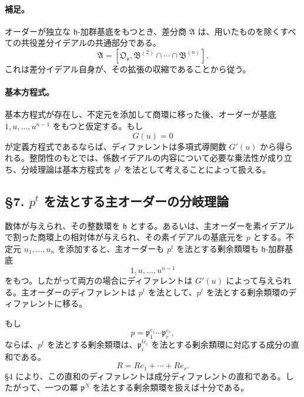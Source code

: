 \paragraph{補足。}
オーダーが独立な \(\mathfrak h\)-加群基底をもつとき、差分商 \(\mathfrak A\) は、用いたものを除くすべての共役差分イデアルの共通部分である。
\[
        \mathfrak A=[\mathfrak O_{\mathfrak o},
        \mathfrak B^{(2)}\cap\cdots\cap\mathfrak B^{(n)}].
\]
これは差分イデアル自身が、その拡張の収縮であることから従う。

\paragraph{基本方程式。}
基本方程式が存在し、不定元を添加して商環に移った後、オーダーが基底 \(1,u,\ldots,u^{n-1}\) をもつと仮定する。もし
\[
        G(u)=0
\]
が定義方程式であるならば、ディファレントは多項式導関数 \(G'(u)\) から得られる。整閉性のもとでは、係数イデアルの内容について必要な乗法性が成り立ち、分岐理論は基本方程式を \(p^t\) を法として考えることによって扱える。

\subsection*{§7. \(p^t\) を法とする主オーダーの分岐理論}

数体が与えられ、その整数環を \(\mathfrak h\) とする。あるいは、主オーダーを素イデアルで割った商環上の相対体が与えられ、その素イデアルの基底元を \(p\) とする。不定元 \(u_1,\ldots,u_n\) を添加すると、主オーダーも \(p^t\) を法とする剰余類環も \(\mathfrak h\)-加群基底
\[
        1,u,\ldots,u^{n-1}
\]
をもつ。したがって両方の場合にディファレントは \(G'(u)\) によって与えられる。主オーダーのディファレントは \(p^t\) を法として、\(p^t\) を法とする剰余類環のディファレントに移る。

もし
\[
        p=\mathfrak p_1^{e_1}\cdots\mathfrak p_r^{e_r},
\]
ならば、\(p^t\) を法とする剰余類環は、\(\mathfrak p_i^{te_i}\) を法とする剰余類環に対応する成分の直和である。
\[
        R=Re_1+\cdots+Re_r.
\]
§4 により、この直和のディファレントは成分ディファレントの直和である。したがって、一つの冪 \(\mathfrak p^N\) を法とする剰余類環を扱えば十分である。

